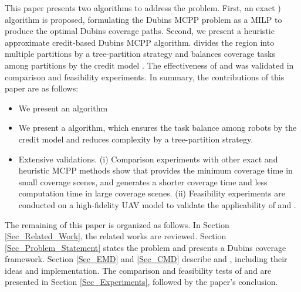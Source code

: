 \documentclass[journal,article,submit,pdftex,moreauthors]{Definitions/mdpi}
\begin{document}

This paper presents two algorithms to address the  problem. First, an exact ) algorithm is proposed, formulating the Dubins MCPP problem as a MILP to produce the optimal Dubins coverage paths. Second, we present a heuristic approximate credit-based  Dubins MCPP  algorithm.  divides the region into multiple partitions by a tree-partition strategy and balances coverage tasks among partitions by the credit model \cite{li2022complete}. The effectiveness of  and  was validated in comparison and feasibility experiments. In summary, the contributions of this paper are as follows:
\begin{itemize}
\item We present an  algorithm 
\item We present a  algorithm, which ensures the task balance among robots by the credit model and reduces complexity by a tree-partition strategy.
\item Extensive validations. (i) Comparison experiments with other exact and heuristic MCPP methods show that  provides the minimum coverage time in small coverage scenes, and  generates a shorter coverage time and less computation time in large coverage scenes. (ii) Feasibility experiments are conducted on a high-fidelity UAV model to validate the applicability of  and .
\end{itemize}

The remaining of this paper is organized as follows. In Section \ref{Sec_Related_Work}, the related works are reviewed. Section \ref{Sec_Problem_Statement} states the  problem and presents a Dubins coverage framework. Section \ref{Sec_EMD} and \ref{Sec_CMD} describe  and , including their ideas and implementation. The comparison and feasibility tests of  and  are presented in Section \ref{Sec_Experiments}, followed by the paper's conclusion.
\end{document}
